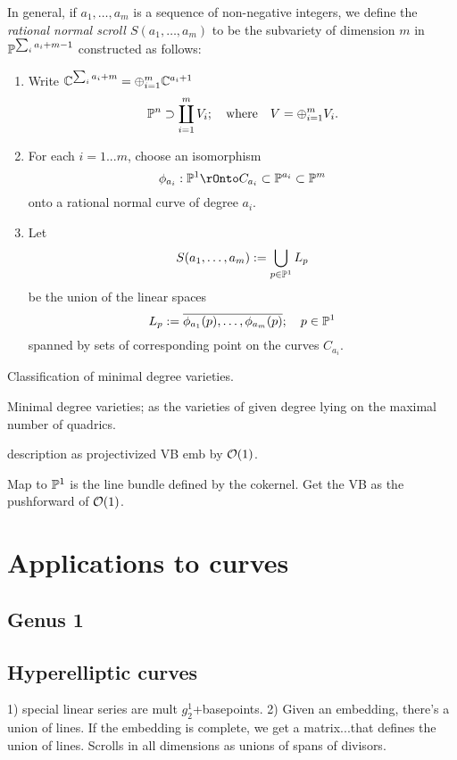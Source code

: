 
In general, if $a_1,\dots, a_m$ is a sequence of non-negative integers, we define the  \emph{rational normal scroll $S(a_1,\dots, a_m)$} 
to be the subvariety of dimension $m$ in $\PP^{\sum_i a_i+m-1}$ constructed as follows:

\begin{enumerate}
 \item Write $\CC^{\sum_i a_i+m} = \oplus_{i=1}^m\CC^{a_i+1}$ 
$$
\PP^n \supset \coprod_{i= 1}^m V_i; \quad \hbox{where} \quad V = \oplus_{i= 1}^m V_i.
$$
\item For each $i = 1...m$, choose an isomorphism 
$$
\phi_{a_i}:\PP^1\rOnto C_{a_i}\subset \PP^{a_i}\subset \PP^m
$$ 
onto a rational normal curve of degree $a_i$.
\item Let 
$$
S(a_1,\dots,a_m) := \bigcup_{p\in \PP^1} L_p
$$
 be the union of the linear spaces 
$$
L_p := \overline{\phi_{a_1}(p), \dots, \phi_{a_m}(p)}; \quad p\in \PP^1
$$
spanned by sets of corresponding point on the curves $C_{a_i}$.
\end{enumerate}


\begin{fact} 
 Classification of minimal degree varieties.
 
 Minimal degree varieties; as the varieties of given degree lying on the maximal number of quadrics.

\end{fact}
 
description as projectivized VB emb by $\cO(1)$.

  Map to $\PP^1$ is the line bundle defined by the cokernel. Get the VB as the pushforward of $\cO(1)$.

\section{Applications to curves}

\subsection{Genus 1}

\subsection{ Hyperelliptic curves}
 1) special linear series are mult $g^1_2$+basepoints. 2) Given an embedding, there's a union of lines. If the embedding is complete, we get a matrix...that defines the union of lines. Scrolls in all dimensions as unions of spans of divisors.

